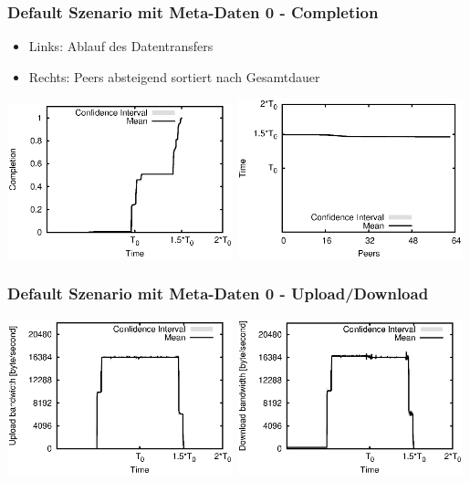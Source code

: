 \begin{frame}
  \frametitle{Default Szenario mit Meta-Daten 0 - Completion}
  \begin{itemize}  
    \item Links: Ablauf des Datentransfers
    \item Rechts: Peers absteigend sortiert nach Gesamtdauer
  \end{itemize}

  \begin{center}
    \includegraphics[width=0.49\textwidth]{fig/plots/scenario_5_meta_data_0/plots/GeneratedMeanChunkCompletion.csv.eps}
    \hfill
    \includegraphics[width=0.49\textwidth]{fig/plots/scenario_5_meta_data_0/plots/GeneratedMeanSortedChunkCompletion.csv.eps}
  \end{center}
\end{frame}


\begin{frame}
  \frametitle{Default Szenario mit Meta-Daten 0 - Upload/Download}
  \begin{center}
    \includegraphics[width=0.49\textwidth]{fig/plots/scenario_5_meta_data_0/plots/GeneratedMeanCurrentUploadBandwidth.csv.eps}
    \includegraphics[width=0.49\textwidth]{fig/plots/scenario_5_meta_data_0/plots/GeneratedMeanCurrentDownloadBandwidth.csv.eps}
  \end{center}
\end{frame}


